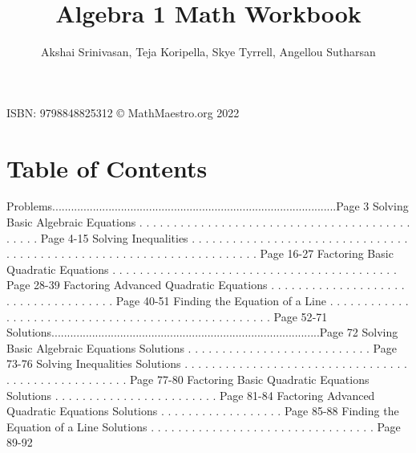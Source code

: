 \documentclass{article}%
\title{Algebra 1 Math Workbook}%
\author{Akshai Srinivasan, Teja Koripella, Skye Tyrrell, Angellou Sutharsan}%
\date{}%
\begin{document}
%
\normalsize%
\maketitle%
\vfill%
\begin{center}%
ISBN: 9798848825312%
\linebreak%
\copyright%
MathMaestro.org 2022%
\end{center}%
\newpage%
\section{Table of Contents}%
\label{sec:TableofContents}%
Problems...........................................................................................Page 3%
\newline%
Solving Basic Algebraic Equations%
.%
.%
.%
.%
.%
.%
.%
.%
.%
.%
.%
.%
.%
.%
.%
.%
.%
.%
.%
.%
.%
.%
.%
.%
.%
.%
.%
.%
.%
.%
.%
.%
.%
.%
.%
.%
.%
.%
.%
.%
.%
.%
.%
.%
.%
Page 4{-}15%
\newline%
Solving Inequalities%
.%
.%
.%
.%
.%
.%
.%
.%
.%
.%
.%
.%
.%
.%
.%
.%
.%
.%
.%
.%
.%
.%
.%
.%
.%
.%
.%
.%
.%
.%
.%
.%
.%
.%
.%
.%
.%
.%
.%
.%
.%
.%
.%
.%
.%
.%
.%
.%
.%
.%
.%
.%
.%
.%
.%
.%
.%
.%
.%
.%
.%
.%
.%
.%
.%
.%
.%
.%
.%
Page 16{-}27%
\newline%
Factoring Basic Quadratic Equations%
.%
.%
.%
.%
.%
.%
.%
.%
.%
.%
.%
.%
.%
.%
.%
.%
.%
.%
.%
.%
.%
.%
.%
.%
.%
.%
.%
.%
.%
.%
.%
.%
.%
.%
.%
.%
.%
.%
.%
.%
.%
.%
Page 28{-}39%
\newline%
Factoring Advanced Quadratic Equations%
.%
.%
.%
.%
.%
.%
.%
.%
.%
.%
.%
.%
.%
.%
.%
.%
.%
.%
.%
.%
.%
.%
.%
.%
.%
.%
.%
.%
.%
.%
.%
.%
.%
.%
.%
.%
Page 40{-}51%
\newline%
Finding the Equation of a Line%
.%
.%
.%
.%
.%
.%
.%
.%
.%
.%
.%
.%
.%
.%
.%
.%
.%
.%
.%
.%
.%
.%
.%
.%
.%
.%
.%
.%
.%
.%
.%
.%
.%
.%
.%
.%
.%
.%
.%
.%
.%
.%
.%
.%
.%
.%
.%
.%
.%
.%
.%
Page 52{-}71%
\newline%
Solutions......................................................................................Page 72%
\newline%
Solving Basic Algebraic Equations Solutions%
.%
.%
.%
.%
.%
.%
.%
.%
.%
.%
.%
.%
.%
.%
.%
.%
.%
.%
.%
.%
.%
.%
.%
.%
.%
.%
.%
Page 73{-}76%
\newline%
Solving Inequalities Solutions%
.%
.%
.%
.%
.%
.%
.%
.%
.%
.%
.%
.%
.%
.%
.%
.%
.%
.%
.%
.%
.%
.%
.%
.%
.%
.%
.%
.%
.%
.%
.%
.%
.%
.%
.%
.%
.%
.%
.%
.%
.%
.%
.%
.%
.%
.%
.%
.%
.%
.%
.%
Page 77{-}80%
\newline%
Factoring Basic Quadratic Equations Solutions%
.%
.%
.%
.%
.%
.%
.%
.%
.%
.%
.%
.%
.%
.%
.%
.%
.%
.%
.%
.%
.%
.%
.%
.%
Page 81{-}84%
\newline%
Factoring Advanced Quadratic Equations Solutions%
.%
.%
.%
.%
.%
.%
.%
.%
.%
.%
.%
.%
.%
.%
.%
.%
.%
.%
Page 85{-}88%
\newline%
Finding the Equation of a Line Solutions%
.%
.%
.%
.%
.%
.%
.%
.%
.%
.%
.%
.%
.%
.%
.%
.%
.%
.%
.%
.%
.%
.%
.%
.%
.%
.%
.%
.%
.%
.%
.%
.%
.%
Page 89{-}92%
\newline%
\newpage
\end{document}
